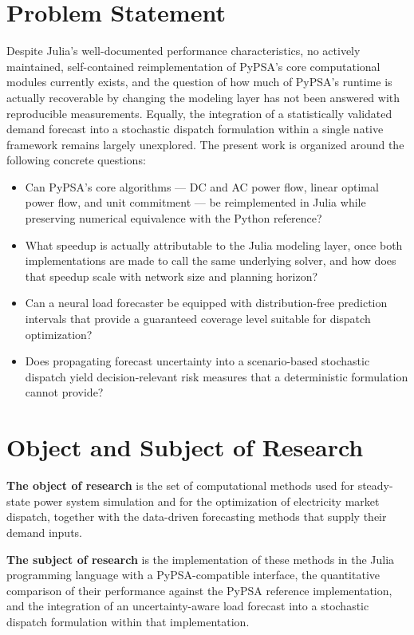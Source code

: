 \section*{Problem Statement}

Despite Julia's well-documented performance characteristics, no actively maintained, self-contained reimplementation of PyPSA's core computational modules currently exists, and the question of how much of PyPSA's runtime is actually recoverable by changing the modeling layer has not been answered with reproducible measurements. Equally, the integration of a statistically validated demand forecast into a stochastic dispatch formulation within a single native framework remains largely unexplored. The present work is organized around the following concrete questions:

\begin{itemize}
    \item Can PyPSA's core algorithms --- DC and AC power flow, linear optimal power flow, and unit commitment --- be reimplemented in Julia while preserving numerical equivalence with the Python reference?
    \item What speedup is actually attributable to the Julia modeling layer, once both implementations are made to call the same underlying solver, and how does that speedup scale with network size and planning horizon?
    \item Can a neural load forecaster be equipped with distribution-free prediction intervals that provide a guaranteed coverage level suitable for dispatch optimization?
    \item Does propagating forecast uncertainty into a scenario-based stochastic dispatch yield decision-relevant risk measures that a deterministic formulation cannot provide?
\end{itemize}

\section*{Object and Subject of Research}

\textbf{The object of research} is the set of computational methods used for steady-state power system simulation and for the optimization of electricity market dispatch, together with the data-driven forecasting methods that supply their demand inputs.

\textbf{The subject of research} is the implementation of these methods in the Julia programming language with a PyPSA-compatible interface, the quantitative comparison of their performance against the PyPSA reference implementation, and the integration of an uncertainty-aware load forecast into a stochastic dispatch formulation within that implementation.


